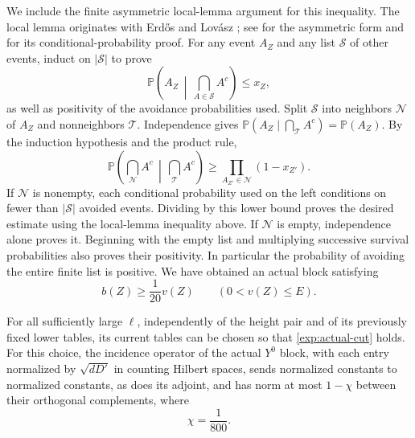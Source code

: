 We include the finite asymmetric local-lemma argument for this inequality.
The local lemma originates with Erd{\H o}s and Lov{\'a}sz \cite{ErdosLovasz1975};
see \cite[Theorem~1.1]{MoserTardos2010} for the asymmetric form and
\cite[Section~5.1]{AlonSpencer2016} for its conditional-probability proof. For
any event $A_Z$ and any list $\mathcal S$ of other events, induct
on $|\mathcal S|$ to prove
\[
 \mathbb P\left(A_Z\,\middle|\,
          \bigcap_{A\in\mathcal S}A^c\right)\leq x_Z,
\]
as well as positivity of the avoidance probabilities used. Split
$\mathcal S$ into neighbors $\mathcal N$ of $A_Z$ and nonneighbors
$\mathcal T$. Independence gives
$\mathbb P(A_Z\mid\bigcap_{\mathcal T}A^c)=\mathbb P(A_Z)$.
By the induction hypothesis and the product rule,
\[
 \mathbb P\left(\bigcap_{\mathcal N}A^c\,\middle|\,
                       \bigcap_{\mathcal T}A^c\right)
 \geq\prod_{A_{Z'}\in\mathcal N}(1-x_{Z'}).
\]
If $\mathcal N$ is nonempty, each conditional probability used on
the left conditions on fewer than $|\mathcal S|$ avoided events.
Dividing by this lower bound proves the desired estimate using the
local-lemma inequality above. If $\mathcal N$ is empty, independence
alone proves it. Beginning with the empty list and multiplying
successive survival probabilities also proves their positivity.
In particular the probability of avoiding the entire finite list is
positive. We have obtained an actual block satisfying
\begin{equation}
 b(Z)\geq\frac1{20}v(Z)
 \qquad(0<v(Z)\leq E).
 \label{exp:actual-cut}
\end{equation}

\begin{proposition}
\label{exp:realized-gap}
For all sufficiently large $\ell$, independently of the height
pair and of its previously fixed lower tables, its current tables
can be chosen so that \eqref{exp:actual-cut} holds. For this choice,
the incidence operator of the actual $Y^0$ block, with each entry
normalized by $\sqrt{dD'}$ in counting Hilbert spaces, sends normalized
constants to normalized constants, as does its adjoint, and has norm
at most $1-\chi$ between their orthogonal complements, where
\[
 \chi=\frac1{800}.
\]
\end{proposition}

